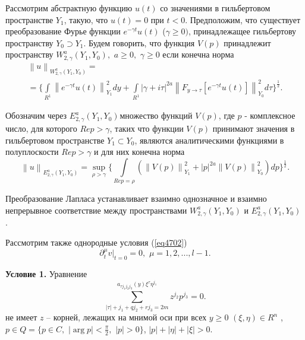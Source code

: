 Рассмотрим абстрактную функцию $u(t)$ со значениями в ги\-ль\-бе\-р\-то\-вом
пространстве $Y_1 $, такую, что $u(t) = 0$ при $t < 0$. Предположим, что
существует преобразование Фурье функции $e^{ - \gamma t}u(t)$ ($\gamma \geqslant
0)$, принадлежащее гильбертову пространству $Y_0 \supset Y_1 $. Будем
говорить, что функция $V(p)$ принадлежит пространству $W_{2,\gamma }^a (Y_1
,Y_0 ),\,\,a \geqslant 0,\,\,\gamma \geqslant 0$ если конечна норма
\begin{multline*}
\left\| u \right\|_{W_{2,\gamma }^a (Y_1 ,Y_0 )} =
\\=
\{\int\limits_{R^1}
{\left\| {e^{ - \gamma t}u(t)} \right\|_{Y_1 }^2 dy} + \int\limits_{R^1}
{\left| {\gamma + i\tau } \right|^{2a}\left\| {F_{y \to \tau } [e^{ - \gamma
t}u(t)]} \right\|_{Y_0 }^2 d\tau \}^{\frac{1}{2}}} .
\end{multline*}



Обозначим через $E_{2,\gamma }^a (Y_1 ,Y_0 )_{ }$множество функций $V(p)$,
где $p$ - комплексное число, для которого $Rep > \gamma $, таких что функции
$V(p)$ принимают значения в гильбертовом пространстве $Y_1 \subset Y_0 $,
являются аналитическими функциями в полуплоскости $Rep > \gamma $ и для них
конечна норма
\[
\left\| u \right\|_{E_{2,\gamma }^a (Y_1 ,Y_0 )} = \mathop {\sup
}\limits_{\rho > \gamma } \{\int\limits_{Rep = \rho } {(\left\| {V(p)}
\right\|_{Y_1 }^2 + \left| p \right|^{2a}\left\| {V(p)} \right\|_{Y_0 }^2
)dp} \}^{\frac{1}{2}}.
\]

Преобразование Лапласа устанавливает взаимно однозначное и взаимно
непрерывное соответствие между пространствами $W_{2,\gamma }^a (Y_1 ,Y_0 )$
и $E_{2,\gamma }^a (Y_1 ,Y_0 )$ .

Рассмотрим также однородные условия (\ref{eq4702})
\begin{equation}
\label{eq4703}
\partial _t^\mu \left. v \right|_{t = 0} = 0,\,\,\mu = 1,2,...,l - 1.
\end{equation}



\textbf{Условие 1.} Уравнение
\begin{equation}
\label{eq4704}
\sum\limits_{\left| \tau \right| + j_1 + qj_2 + rj_3 = 2m}^ {a_{\tau j_1 j_2
j_3 } (y)\xi ^\tau \eta ^{j_1 }} z^{j_2 }p^{j_3 } = 0.
\end{equation}
не имеет $z$ -- корней, лежащих на мнимой оси при всех $y \geqslant 0\,\,(\xi
,\eta ) \in R^n\,\,$, $p \in Q = \{p \in C,\,\,\left| {\arg p} \right| <
\frac{\pi }{2},\,\,\left| p \right| > 0\}$, $\left| p \right| + \left| \eta
\right| + \left| \xi \right| > 0$.

